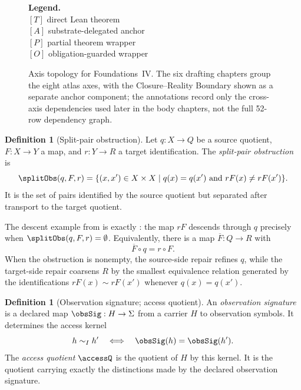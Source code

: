 \documentclass[11pt]{article}
\newcommand{\FIV}{Foundations~IV}
\theoremstyle{definition}
\newtheorem{definition}[theorem]{Definition}
\begin{document}
\begin{figure}[t]
\vspace{0.75em}

\qquad
\begin{minipage}{0.31\linewidth}
\textbf{Legend.}\\
\([T]\) direct Lean theorem\\
\([A]\) substrate-delegated anchor\\
\([P]\) partial theorem wrapper\\
\([O]\) obligation-guarded wrapper
\end{minipage}

\caption{Axis topology for \FIV.  The six drafting chapters group the
eight atlas axes, with the Closure--Reality Boundary shown as a
separate anchor component; the annotations record only the
cross-axis dependencies used later in the body chapters, not the full
52-row dependency graph.}
\label{fig:axis-topology}
\end{figure}
 
\begin{definition}[Split-pair obstruction]\label{def:split-pair}
Let \(q:X\to Q\) be a source quotient, \(F:X\to Y\) a map, and
\(r:Y\to R\) a target identification.  The \emph{split-pair
obstruction} is
\[
  \splitObs(q,F,r)
  =
  \{(x,x')\in X\times X
    \mid q(x)=q(x')\ \text{and}\ rF(x)\ne rF(x')\}.
\]
It is the set of pairs identified by the source quotient but separated
after transport to the target quotient.
\end{definition}

The descent example from  is exactly
: the map \(rF\) descends through \(q\) precisely
when \(\splitObs(q,F,r)=\emptyset\).  Equivalently, there is a map
\(\overline F:Q\to R\) with
\[
  \overline F\circ q=r\circ F .
\]
When the obstruction is nonempty, the source-side repair refines
\(q\), while the target-side repair coarsens \(R\) by the smallest
equivalence relation generated by the identifications
\(rF(x)\sim rF(x')\) whenever \(q(x)=q(x')\).

\begin{definition}[Observation signature; access quotient]\label{def:access-quotient}
An \emph{observation signature} is a declared map
\(\obsSig:H\to \Sigma\) from a carrier \(H\) to observation symbols.
It determines the access kernel
\[
  h\sim_I h'
  \quad\Longleftrightarrow\quad
  \obsSig(h)=\obsSig(h').
\]
The \emph{access quotient} \(\accessQ\) is the quotient of \(H\) by
this kernel.  It is the quotient carrying exactly the distinctions made
by the declared observation signature.
\end{definition}
\end{document}
